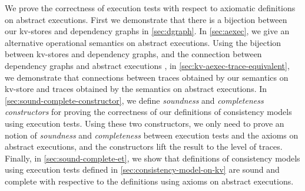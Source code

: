 We prove the correctness of execution tests with respect to axiomatic definitions on abstract executions.
First we demonstrate that there is a bijection between our kv-stores and dependency graphs in \cref{sec:dgraph}.
In \cref{sec:aexec}, we give an alternative operational semantics on abstract executions.
Using the bijection between kv-stores and dependency graphs, 
and the connection between dependency graphs and abstract executions \citep{laws,SIanalysis}, 
in \cref{sec:kv-aexec-trace-equivalent}, we demonstrate that connections between 
traces obtained by our semantics on kv-store and traces obtained by the semantics on abstract executions.
In \cref{sec:sound-complete-constructor},
we define \emph{soundness} and \emph{completeness constructors} for proving the correctness of our definitions
of consistency models using execution tests.
Using these two constructors, 
we only need to prove an notion of \emph{soundness} and \emph{completeness}
between execution tests and the axioms on abstract executions,
and the constructors lift the result to the level of traces.
Finally, in \cref{sec:sound-complete-et},
we show that definitions of consistency models using execution tests defined in \cref{sec:consistency-model-on-kv} 
are sound and complete with respective to the definitions using axioms on abstract executions.
